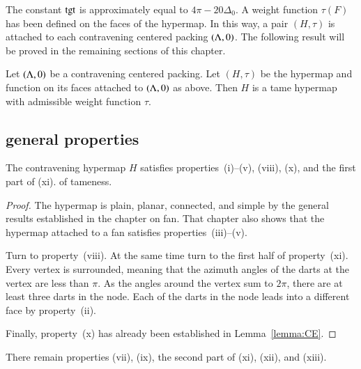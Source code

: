 {The constant ${\operatorname{tgt}}$ is approximately equal to $4\pi - 20\Delta_0$.
A weight function $\tau(F)$ has been defined on the faces of the hypermap.  In this way,  a pair $(H,\tau)$ is attached to each contravening centered packing $(\Lambda,0)$.  The following result will be proved in the remaining sections of this chapter.

\begin{theorem} \label{theorem:contravene}
Let $(\Lambda,0)$ be a contravening centered packing.  Let $(H,\tau)$ be
the hypermap and function on its faces attached to $(\Lambda,0)$ as above.
Then $H$ is a tame hypermap with admissible weight function $\tau$.
\end{theorem}




\subsection{general properties}
    \label{sec:startame}



\begin{lemma} %
The contravening hypermap $H$ satisfies properties~(i)--(v),  %
(viii),  (x), and the first part of (xi).
of tameness.
\end{lemma}

\begin{proof}
The hypermap is plain, planar, connected, and simple by the general results established in the chapter on fan.  That chapter also shows that the hypermap attached to a fan satisfies properties~(iii)--(v).  

Turn to property~(viii). At the same time turn to the first half of property~(xi).  Every vertex is surrounded, meaning that the azimuth angles of the darts at the vertex are less than $\pi$.  As the angles around the vertex sum to $2\pi$, there are at least three darts in the node. Each of the darts in the node leads into a different face by property~(ii).

Finally, property~(x) has already been established in Lemma~\ref{lemma:CE}.
\end{proof}

There remain properties (vii), (ix), the second part of (xi), (xii), and (xiii).







}
